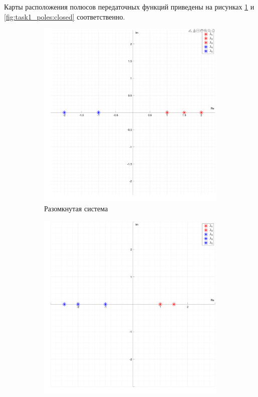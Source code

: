 Карты расположения полюсов передаточных функций приведены на рисунках \ref{fig:task1_poles:open} и \ref{fig:task1_poles:closed} соответственно.
\begin{figure}[ht!]
    \centering
    \begin{subfigure}{0.5\textwidth}
        \includegraphics[width=\textwidth]{media/plots/task1_poles_open.png}
        \caption{Разомкнутая система}
        \label{fig:task1_poles:open}
    \end{subfigure}%
    \begin{subfigure}{0.5\textwidth}
        \includegraphics[width=\textwidth]{media/plots/task1_poles_closed.png}

\end{subfigure}
\end{figure}
